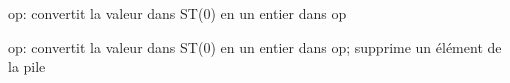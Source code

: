   \item[FIST] op: convertit la valeur dans ST(0) en un entier dans op
  \item[FISTP] op: convertit la valeur dans ST(0) en un entier dans op;
  supprime un élément de la pile

